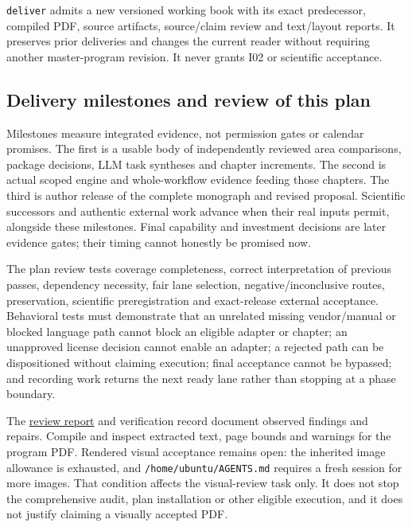 \documentclass[
  10pt,
]{article}
\begin{document}
\texttt{deliver} admits a new versioned working book with its exact
predecessor, compiled PDF, source artifacts, source/claim review and
text/layout reports. It preserves prior deliveries and changes the
current reader without requiring another master-program revision. It
never grants I02 or scientific acceptance.

\hypertarget{delivery-milestones-and-review-of-this-plan}{%
\subsection{Delivery milestones and review of this
plan}\label{delivery-milestones-and-review-of-this-plan}}

Milestones measure integrated evidence, not permission gates or calendar
promises. The first is a usable body of independently reviewed area
comparisons, package decisions, LLM task syntheses and chapter
increments. The second is actual scoped engine and whole-workflow
evidence feeding those chapters. The third is author release of the
complete monograph and revised proposal. Scientific successors and
authentic external work advance when their real inputs permit, alongside
these milestones. Final capability and investment decisions are later
evidence gates; their timing cannot honestly be promised now.

The plan review tests coverage completeness, correct interpretation of
previous passes, dependency necessity, fair lane selection,
negative/inconclusive routes, preservation, scientific preregistration
and exact-release external acceptance. Behavioral tests must demonstrate
that an unrelated missing vendor/manual or blocked language path cannot
block an eligible adapter or chapter; an unapproved license decision
cannot enable an adapter; a rejected path can be dispositioned without
claiming execution; final acceptance cannot be bypassed; and recording
work returns the next ready lane rather than stopping at a phase
boundary.

The \href{comprehensive-v14/review.md}{review report} and verification
record document observed findings and repairs. Compile and inspect
extracted text, page bounds and warnings for the program PDF. Rendered
visual acceptance remains open: the inherited image allowance is
exhausted, and \texttt{/home/ubuntu/AGENTS.md} requires a fresh session
for more images. That condition affects the visual-review task only. It
does not stop the comprehensive audit, plan installation or other
eligible execution, and it does not justify claiming a visually accepted
PDF.
\end{document}
